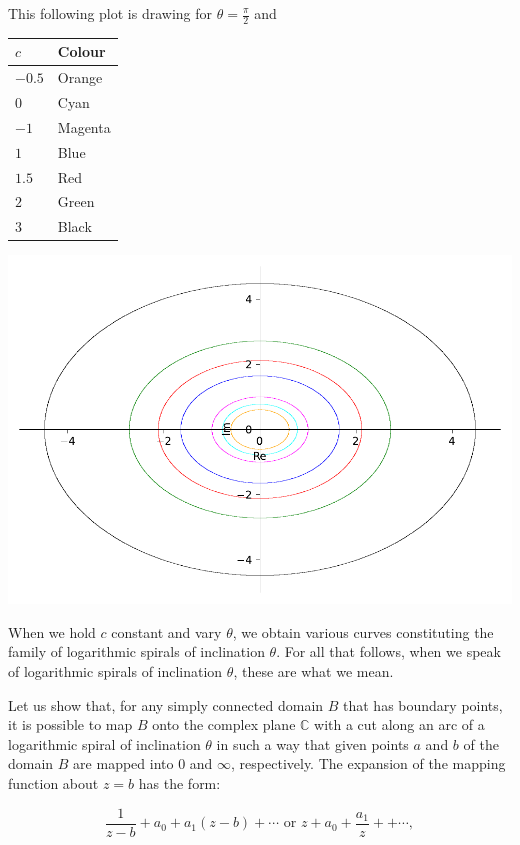 \documentclass[
]{book}
\theoremstyle{definition}
\theoremstyle{definition}
\theoremstyle{definition}
\theoremstyle{definition}
\theoremstyle{remark}
\begin{document}
This following plot is drawing for \(\theta=\frac{\pi}{2}\) and

\begin{longtable}[]{@{}ll@{}}
\toprule\noalign{}
\(c\) & Colour \\
\midrule\noalign{}
\endhead
\bottomrule\noalign{}
\endlastfoot
\(-0.5\) & Orange \\
\(0\) & Cyan \\
\(-1\) & Magenta \\
\(1\) & Blue \\
\(1.5\) & Red \\
\(2\) & Green \\
\(3\) & Black \\
\end{longtable}

\includegraphics{ConformalMapping_files/figure-latex/unnamed-chunk-69-1.pdf}

When we hold \(c\) constant and vary \(\theta\), we obtain various curves constituting the family of logarithmic spirals of inclination \(\theta\). For all that follows, when we speak of logarithmic spirals of inclination \(\theta\), these are what we mean.

Let us show that, for any simply connected domain \(B\) that has boundary points, it is possible to map \(B\) onto the complex plane \(\mathbb{C}\) with a cut along an arc of a logarithmic spiral of inclination \(\theta\) in such a way that given points \(a\) and \(b\) of the domain \(B\) are mapped into \(0\) and \(\infty\), respectively. The expansion of the mapping function about \(z = b\) has the form:

\[ \frac{1}{z - b} +a_0+a_1{(z - b)} +\cdots\text{ or }  z+a_0+\frac{a_1}{z} +  + \cdots, \]
\end{document}
